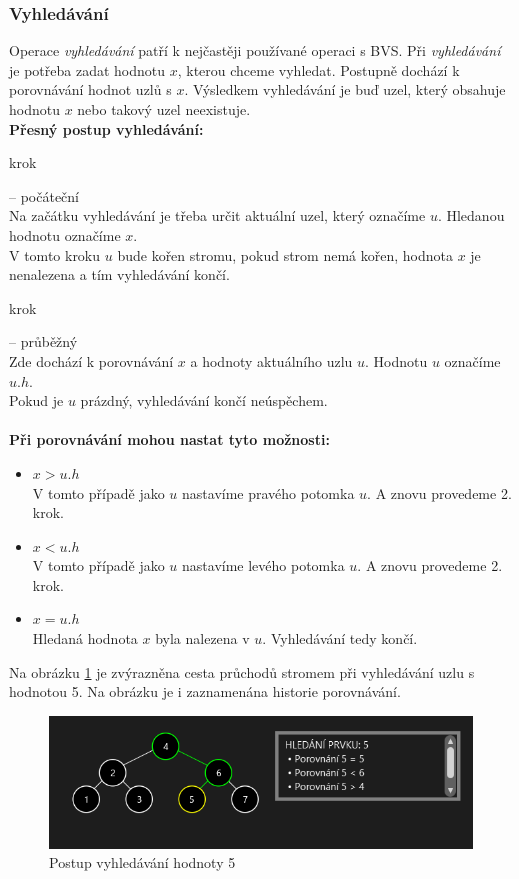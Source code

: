 \documentclass[
  biblatex=false,
  font=serif,
  glossaries=false,
  tables=false,
  theorems=false,
  index
]{kidiplom}
\begin{document}
\subsubsection{Vyhledávání}
\indent\indent Operace \textit{vyhledávání} patří k nejčastěji používané operaci s BVS. Při \textit{vyhledávání} je potřeba zadat hodnotu $x$, kterou chceme vyhledat. Postupně dochází k porovnávání hodnot uzlů s $x$. Výsledkem vyhledávání je buď uzel, který obsahuje hodnotu $x$ nebo takový uzel neexistuje.\\

\noindent \textbf{Přesný postup vyhledávání:}
\begin{enumerate} {\bfseries
\item  krok} -- počáteční \\
Na začátku vyhledávání je třeba určit aktuální uzel, který označíme $u$. Hledanou hodnotu označíme $x$.\\
V tomto kroku $u$ bude kořen stromu, pokud strom nemá kořen, hodnota $x$ je nenalezena a tím vyhledávání končí.
{\bfseries\item  krok} -- průběžný \\
Zde dochází k porovnávání $x$ a hodnoty aktuálního uzlu $u$. Hodnotu $u$ označíme $u.h$.\\
Pokud je $u$ prázdný, vyhledávání končí neúspěchem. \\\\
\textbf{Při porovnávání mohou nastat tyto možnosti:}
\begin{itemize}
\item $x > u.h$ \\
V tomto případě jako $u$ nastavíme pravého potomka $u$. A znovu provedeme 2. krok.
\newpage
\item $x < u.h$\\
V tomto případě jako $u$ nastavíme levého potomka $u$. A znovu provedeme 2. krok.
\item $x = u.h$\\
Hledaná hodnota $x$ byla nalezena v $u$. Vyhledávání tedy končí.
\end{itemize}
\end{enumerate}

\medskip
\noindent Na obrázku \ref{binarySearch} je zvýrazněna cesta průchodů stromem při vyhledávání uzlu s hodnotou 5. Na obrázku je i zaznamenána historie porovnávání.

\begin{figure}[h!]
\centering
	\includegraphics[scale=0.9]{obrazky/5BinarniVyhledavani.png}
	\caption{Postup vyhledávání hodnoty 5}
	\label{binarySearch}
\end{figure}
\end{document}
